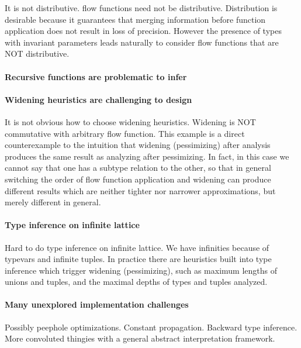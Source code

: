 \documentclass[pldi]{sigplanconf-pldi15}
\begin{document}
It is not distributive.
flow functions need not be distributive. Distribution is desirable because it
guarantees that merging information before function application does not result
in loss of precision. However the presence of types with invariant parameters
leads naturally to consider flow functions that are NOT distributive.

\paragraph{Recursive functions are problematic to infer}

\paragraph{Widening heuristics are challenging to design}
It is not obvious how to choose widening heuristics. Widening is NOT
commutative with arbitrary flow function. This example is a direct
counterexample to the intuition that widening (pessimizing) after analysis
produces the same result as analyzing after pessimizing. In fact, in this case
we cannot say that one has a subtype relation to the other, so that in general
switching the order of flow function application and widening can produce
different results which are neither tighter nor narrower approximations, but
merely different in general.

\paragraph{Type inference on infinite lattice}
Hard to do type inference on infinite lattice. We have infinities because of
typevars and infinite tuples.  In practice there are heuristics built into type
inference which trigger widening (pessimizing), such as maximum lengths of
unions and tuples, and the maximal depths of types and tuples analyzed.
 

\paragraph{Many unexplored implementation challenges}
Possibly peephole optimizations. Constant propagation. Backward type inference.
More convoluted thingies with a general abstract interpretation framework.




\listoftodos %



\end{document}

